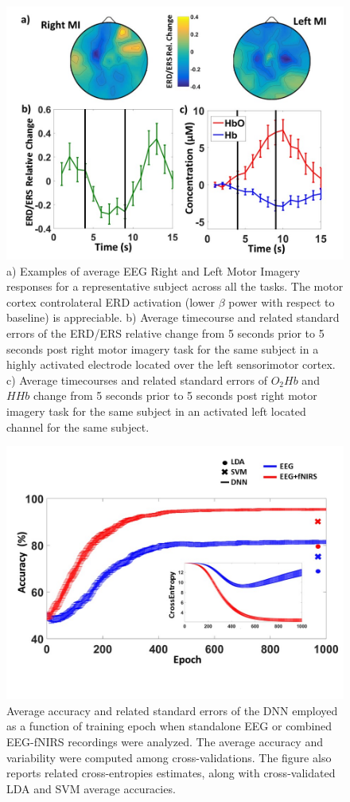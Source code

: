 \documentclass[12pt]{iopart}
\begin{document}
\begin{figure}
	\includegraphics[width=\linewidth]{Slide4.JPG}
	\caption{a) Examples of average EEG Right and Left Motor Imagery responses for a representative subject across all the tasks.
	The motor cortex controlateral ERD activation (lower $\beta$ power with respect to baseline) is appreciable. b) Average timecourse and related standard errors of the ERD/ERS relative change from 5 seconds prior to 5 seconds post right motor imagery task for the same subject in a highly activated electrode located over the left sensorimotor cortex. c)  Average timecourses and related standard errors of $O_{2}Hb$ and $HHb$ change from 5 seconds prior to 5 seconds post right motor imagery task for the same subject in an activated left located channel for the same subject.}
	\label{fig:fig4}
\end{figure}

\begin{figure}
	\includegraphics[width=\linewidth]{Slide5.JPG}
	\caption{Average accuracy and related standard errors
		of the DNN employed as a function of training epoch when standalone EEG or combined EEG-fNIRS recordings were analyzed. The average accuracy and variability were computed among cross-validations. 
		The figure also reports related cross-entropies estimates, along with 
		cross-validated LDA and SVM average accuracies.}
	\label{fig:fig5}
\end{figure}
\end{document}
